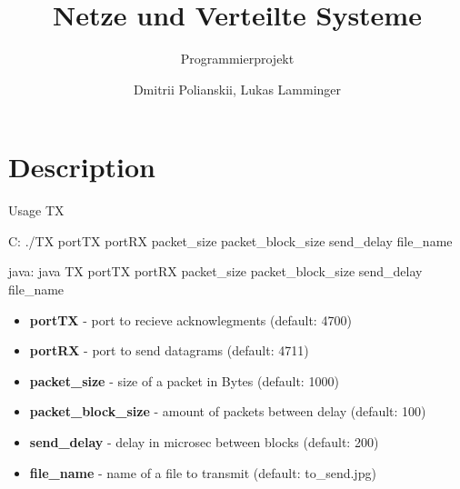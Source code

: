 \documentclass[10pt]{beamer}
\title{Netze und Verteilte Systeme}
\subtitle{Programmierprojekt}
\date{}
\author{Dmitrii Polianskii, Lukas Lamminger}
\institute{Universit\"at Salzburg}
\begin{document}
\maketitle



\section{Description}

\begin{frame}[fragile]{Usage TX}
	\begin{block}{C:}
		\hspace*{2mm} \footnotesize 	 ./TX portTX portRX packet\_size packet\_block\_size send\_delay file\_name
	\end{block}

	\begin{block}{java:}
		\hspace*{2mm} \footnotesize 	 java TX portTX portRX packet\_size packet\_block\_size send\_delay file\_name
	\end{block}
		
  \begin{itemize}
  	\footnotesize 	
    \item{\textbf{portTX}} - port to recieve acknowlegments (default: 4700)
    \item{\textbf{portRX}} - port to send datagrams (default: 4711)
    \item{\textbf{packet\_size}} - size of a packet in Bytes (default: 1000)
    \item{\textbf{packet\_block\_size}} - amount of packets between delay (default: 100)
    \item{\textbf{send\_delay}} - delay in microsec between blocks (default: 200)
    \item{\textbf{file\_name}} - name of a file to transmit (default: to\_send.jpg)
  \end{itemize}
\end{frame}
\end{document}
